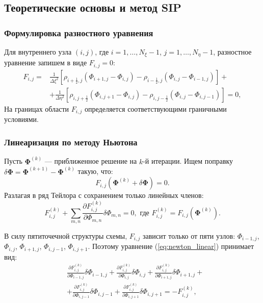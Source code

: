 \documentclass[a4paper,12pt]{article}
\begin{document}
	\subsection{Теоретические основы и метод SIP}
	
	\subsubsection{Формулировка разностного уравнения}
	Для внутреннего узла $(i,j)$, где $i = 1,\dots,N_\xi-1$, $j = 1,\dots,N_\eta-1$, разностное уравнение запишем в виде $F_{i,j} = 0$:
	\begin{equation}
		\begin{aligned}
			F_{i,j} = &\frac{1}{\Delta \xi^2} \left[ \rho_{i+\frac{1}{2},j} (\Phi_{i+1,j} - \Phi_{i,j}) - \rho_{i-\frac{1}{2},j} (\Phi_{i,j} - \Phi_{i-1,j}) \right] + \\
			&+ \frac{1}{\Delta \eta^2} \left[ \rho_{i,j+\frac{1}{2}} (\Phi_{i,j+1} - \Phi_{i,j}) - \rho_{i,j-\frac{1}{2}} (\Phi_{i,j} - \Phi_{i,j-1}) \right] = 0,
		\end{aligned}
		\label{eq:F}
	\end{equation}
	На границах области $F_{i,j}$ определяется соответствующими граничными условиями.
	
	\subsubsection{Линеаризация по методу Ньютона}
	Пусть $\boldsymbol{\Phi}^{(k)}$ — приближенное решение на $k$-й итерации. Ищем поправку $\delta \boldsymbol{\Phi} = \boldsymbol{\Phi}^{(k+1)} - \boldsymbol{\Phi}^{(k)}$ такую, что:
	\[
	F_{i,j}(\boldsymbol{\Phi}^{(k)} + \delta \boldsymbol{\Phi}) = 0.
	\]
	Разлагая в ряд Тейлора с сохранением только линейных членов:
	\[
	F_{i,j}^{(k)} + \sum_{m,n} \frac{\partial F_{i,j}^{(k)}}{\partial \Phi_{m,n}} \delta \Phi_{m,n} = 0, \text{ где } F_{i,j}^{(k)} = F_{i,j}(\boldsymbol{\Phi}^{(k)}).
	\label{eq:newton_linear}
	\]

	
	В силу пятиточечной структуры схемы, $F_{i,j}$ зависит только от пяти узлов: $\Phi_{i-1,j}$, $\Phi_{i,j}$, $\Phi_{i+1,j}$, $\Phi_{i,j-1}$, $\Phi_{i,j+1}$. Поэтому уравнение (\ref{eq:newton_linear}) принимает вид:
	\begin{equation}
		\begin{aligned}
			& \frac{\partial F_{i,j}^{(k)}}{\partial \Phi_{i-1,j}} \delta \Phi_{i-1,j} + \frac{\partial F_{i,j}^{(k)}}{\partial \Phi_{i,j}} \delta \Phi_{i,j} + \frac{\partial F_{i,j}^{(k)}}{\partial \Phi_{i+1,j}} \delta \Phi_{i+1,j} +\\
			&+ \frac{\partial F_{i,j}^{(k)}}{\partial \Phi_{i,j-1}} \delta \Phi_{i,j-1} + \frac{\partial F_{i,j}^{(k)}}{\partial \Phi_{i,j+1}} \delta \Phi_{i,j+1} = - F_{i,j}^{(k)},
		\end{aligned}
		\label{eq:newton_system}
	\end{equation}
	
\end{document}
